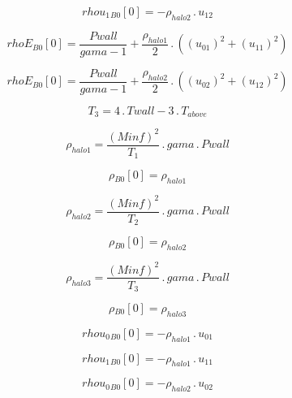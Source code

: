 \documentclass{article}
\begin{document}
\begin{dmath}{rhou_{1}{_{B0}}}[{0}] = - \rho_{halo 2} \,.\, u_{12}\end{dmath}

\begin{dmath}{rhoE{_{B0}}}[{0}] = \frac{Pwall}{gama - 1} + \frac{\rho_{halo 1}}{2} \,.\, \left(\left(u_{01} \right)^{2} + \left(u_{11} \right)^{2}\right)\end{dmath}

\begin{dmath}{rhoE{_{B0}}}[{0}] = \frac{Pwall}{gama - 1} + \frac{\rho_{halo 2}}{2} \,.\, \left(\left(u_{02} \right)^{2} + \left(u_{12} \right)^{2}\right)\end{dmath}

\begin{dmath}T_{3} = 4 \,.\, Twall - 3 \,.\, T_{above}\end{dmath}

\begin{dmath}\rho_{halo 1} = \frac{\left(Minf \right)^{2}}{T_{1}} \,.\, gama \,.\, Pwall\end{dmath}

\begin{dmath}{\rho{_{B0}}}[{0}] = \rho_{halo 1}\end{dmath}

\begin{dmath}\rho_{halo 2} = \frac{\left(Minf \right)^{2}}{T_{2}} \,.\, gama \,.\, Pwall\end{dmath}

\begin{dmath}{\rho{_{B0}}}[{0}] = \rho_{halo 2}\end{dmath}

\begin{dmath}\rho_{halo 3} = \frac{\left(Minf \right)^{2}}{T_{3}} \,.\, gama \,.\, Pwall\end{dmath}

\begin{dmath}{\rho{_{B0}}}[{0}] = \rho_{halo 3}\end{dmath}

\begin{dmath}{rhou_{0}{_{B0}}}[{0}] = - \rho_{halo 1} \,.\, u_{01}\end{dmath}

\begin{dmath}{rhou_{1}{_{B0}}}[{0}] = - \rho_{halo 1} \,.\, u_{11}\end{dmath}

\begin{dmath}{rhou_{0}{_{B0}}}[{0}] = - \rho_{halo 2} \,.\, u_{02}\end{dmath}
\end{document}
